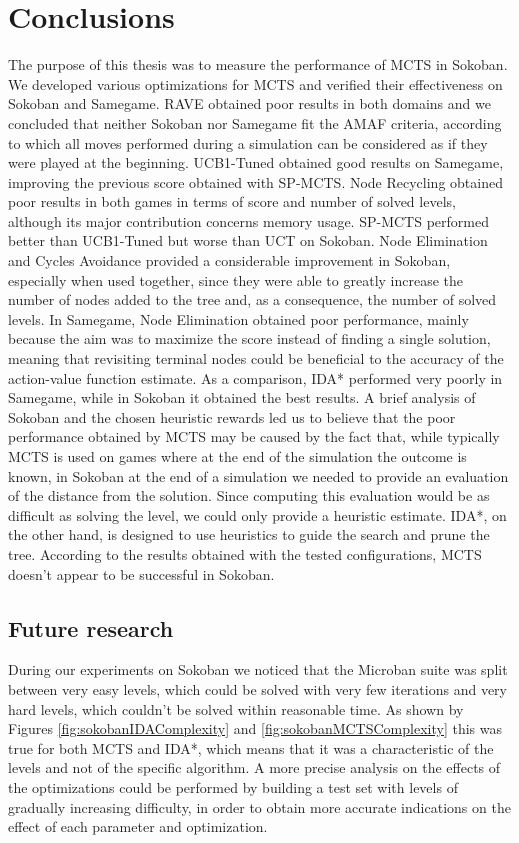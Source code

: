 \chapter{Conclusions}
\label{results}
The purpose of this thesis was to measure the performance of MCTS in Sokoban. We developed various optimizations for MCTS and verified their effectiveness on Sokoban and Samegame. RAVE obtained poor results in both domains and we concluded that neither Sokoban nor Samegame fit the AMAF criteria, according to which all moves performed during a simulation can be considered as if they were played at the beginning. UCB1-Tuned obtained good results on Samegame, improving the previous score obtained with SP-MCTS. Node Recycling obtained poor results in both games in terms of score and number of solved levels, although its major contribution concerns memory usage. SP-MCTS performed better than UCB1-Tuned but worse than UCT on Sokoban. Node Elimination and Cycles Avoidance provided a considerable improvement in Sokoban, especially when used together, since they were able to greatly increase the number of nodes added to the tree and, as a consequence, the number of solved levels. In Samegame, Node Elimination obtained poor performance, mainly because the aim was to maximize the score instead of finding a single solution, meaning that revisiting terminal nodes could be beneficial to the accuracy of the action-value function estimate. As a comparison, IDA* performed very poorly in Samegame, while in Sokoban it obtained the best results. A brief analysis of Sokoban and the chosen heuristic rewards led us to believe that the poor performance obtained by MCTS may be caused by the fact that, while typically MCTS is used on games where at the end of the simulation the outcome is known, in Sokoban at the end of a simulation we needed to provide an evaluation of the distance from the solution. Since computing this evaluation would be as difficult as solving the level, we could only provide a heuristic estimate. IDA*, on the other hand, is designed to use heuristics to guide the search and prune the tree. According to the results obtained with the tested configurations, MCTS doesn't appear to be successful in Sokoban.

\section{Future research}
During our experiments on Sokoban we noticed that the Microban suite was split between very easy levels, which could be solved with very few iterations and very hard levels, which couldn't be solved within reasonable time. As shown by Figures \ref{fig:sokobanIDAComplexity} and \ref{fig:sokobanMCTSComplexity} this was true for both MCTS and IDA*, which means that it was a characteristic of the levels and not of the specific algorithm. A more precise analysis on the effects of the optimizations could be performed by building a test set with levels of gradually increasing difficulty, in order to obtain more accurate indications on the effect of each parameter and optimization.

